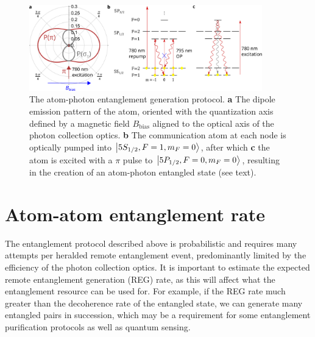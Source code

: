 \begin{figure}[!ht]
    \centering
    \includegraphics[width=0.9\textwidth]{Images/rb87_atomphoton_entanglement_and_photon_emission_pattern2.pdf}
    \caption{The atom-photon entanglement generation protocol. \textbf{a} The dipole emission pattern of the atom, oriented with the quantization axis defined by a magnetic field $B_{\text{bias}}$ aligned to the optical axis of the photon collection optics. \textbf{b} The communication atom at each node is optically pumped into $\ket{5S_{1/2},F=1,m_F=0}$, after which \textbf{c} the atom is excited with a $\pi$ pulse to $\ket{5P_{1/2},F=0,m_F=0}$, resulting in the creation of an atom-photon entangled state (see text).}
    \label{fig:entanglement_generation_steps}
\end{figure}

\section{Atom-atom entanglement rate}\label{sec:entanglementrate}

The entanglement protocol described above is probabilistic and requires many attempts per heralded remote entanglement event, predominantly limited by the efficiency of the photon collection optics. It is important to estimate the expected remote entanglement generation (REG) rate, as this will affect what the entanglement resource can be used for. For example, if the REG rate much greater than the decoherence rate of the entangled state, we can generate many entangled pairs in succession, which may be a requirement for some entanglement purification protocols as well as quantum sensing.


